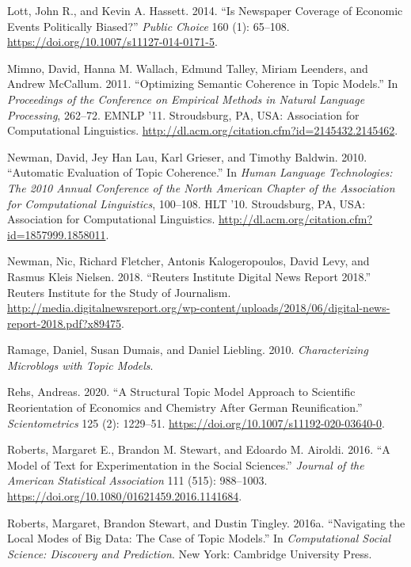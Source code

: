 \documentclass[
]{article}
\begin{document}
\leavevmode\hypertarget{ref-lott_is_2014}{}%
Lott, John R., and Kevin A. Hassett. 2014. ``Is Newspaper Coverage of
Economic Events Politically Biased?'' \emph{Public Choice} 160 (1):
65--108. \url{https://doi.org/10.1007/s11127-014-0171-5}.

\leavevmode\hypertarget{ref-mimno_optimizing_2011}{}%
Mimno, David, Hanna M. Wallach, Edmund Talley, Miriam Leenders, and
Andrew McCallum. 2011. ``Optimizing Semantic Coherence in Topic
Models.'' In \emph{Proceedings of the Conference on Empirical Methods in
Natural Language Processing}, 262--72. EMNLP '11. Stroudsburg, PA, USA:
Association for Computational Linguistics.
\url{http://dl.acm.org/citation.cfm?id=2145432.2145462}.

\leavevmode\hypertarget{ref-newman_automatic_2010}{}%
Newman, David, Jey Han Lau, Karl Grieser, and Timothy Baldwin. 2010.
``Automatic Evaluation of Topic Coherence.'' In \emph{Human Language
Technologies: The 2010 Annual Conference of the North American Chapter
of the Association for Computational Linguistics}, 100--108. HLT '10.
Stroudsburg, PA, USA: Association for Computational Linguistics.
\url{http://dl.acm.org/citation.cfm?id=1857999.1858011}.

\leavevmode\hypertarget{ref-newman_reuters_2018}{}%
Newman, Nic, Richard Fletcher, Antonis Kalogeropoulos, David Levy, and
Rasmus Kleis Nielsen. 2018. ``Reuters Institute Digital News Report
2018.'' Reuters Institute for the Study of Journalism.
\url{http://media.digitalnewsreport.org/wp-content/uploads/2018/06/digital-news-report-2018.pdf?x89475}.

\leavevmode\hypertarget{ref-ramage_characterizing_2010}{}%
Ramage, Daniel, Susan Dumais, and Daniel Liebling. 2010.
\emph{Characterizing Microblogs with Topic Models}.

\leavevmode\hypertarget{ref-rehs_structural_2020}{}%
Rehs, Andreas. 2020. ``A Structural Topic Model Approach to Scientific
Reorientation of Economics and Chemistry After German Reunification.''
\emph{Scientometrics} 125 (2): 1229--51.
\url{https://doi.org/10.1007/s11192-020-03640-0}.

\leavevmode\hypertarget{ref-roberts_model_2016}{}%
Roberts, Margaret E., Brandon M. Stewart, and Edoardo M. Airoldi. 2016.
``A Model of Text for Experimentation in the Social Sciences.''
\emph{Journal of the American Statistical Association} 111 (515):
988--1003. \url{https://doi.org/10.1080/01621459.2016.1141684}.

\leavevmode\hypertarget{ref-roberts_navigating_2016}{}%
Roberts, Margaret, Brandon Stewart, and Dustin Tingley. 2016a.
``Navigating the Local Modes of Big Data: The Case of Topic Models.'' In
\emph{Computational Social Science: Discovery and Prediction}. New York:
Cambridge University Press.
\end{document}
